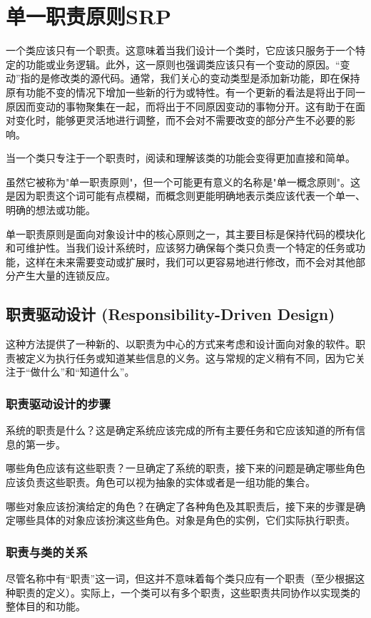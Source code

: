 \section{单一职责原则SRP}
一个类应该只有一个职责。这意味着当我们设计一个类时，它应该只服务于一个特定的功能或业务逻辑。此外，这一原则也强调类应该只有一个变动的原因。“变动”指的是修改类的源代码。通常，我们关心的变动类型是添加新功能，即在保持原有功能不变的情况下增加一些新的行为或特性。有一个更新的看法是将出于同一原因而变动的事物聚集在一起，而将出于不同原因变动的事物分开。这有助于在面对变化时，能够更灵活地进行调整，而不会对不需要改变的部分产生不必要的影响。

当一个类只专注于一个职责时，阅读和理解该类的功能会变得更加直接和简单。

虽然它被称为"单一职责原则"，但一个可能更有意义的名称是"单一概念原则"。这是因为职责这个词可能有点模糊，而概念则更能明确地表示类应该代表一个单一、明确的想法或功能。

单一职责原则是面向对象设计中的核心原则之一，其主要目标是保持代码的模块化和可维护性。当我们设计系统时，应该努力确保每个类只负责一个特定的任务或功能，这样在未来需要变动或扩展时，我们可以更容易地进行修改，而不会对其他部分产生大量的连锁反应。

\subsection{职责驱动设计 (Responsibility-Driven Design)}
这种方法提供了一种新的、以职责为中心的方式来考虑和设计面向对象的软件。职责被定义为执行任务或知道某些信息的义务。这与常规的定义稍有不同，因为它关注于“做什么”和“知道什么”。

\subsubsection{职责驱动设计的步骤}
系统的职责是什么？这是确定系统应该完成的所有主要任务和它应该知道的所有信息的第一步。

哪些角色应该有这些职责？一旦确定了系统的职责，接下来的问题是确定哪些角色应该负责这些职责。角色可以视为抽象的实体或者是一组功能的集合。

哪些对象应该扮演给定的角色？在确定了各种角色及其职责后，接下来的步骤是确定哪些具体的对象应该扮演这些角色。对象是角色的实例，它们实际执行职责。

\subsubsection{职责与类的关系}
尽管名称中有“职责”这一词，但这并不意味着每个类只应有一个职责（至少根据这种职责的定义）。实际上，一个类可以有多个职责，这些职责共同协作以实现类的整体目的和功能。

